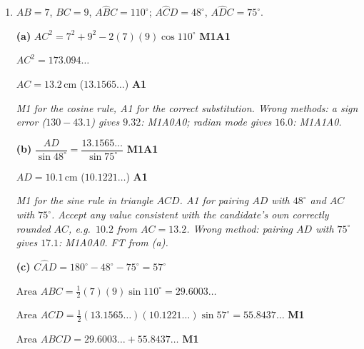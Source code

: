 \documentclass[12pt, twoside]{article}
\begin{document}
\begin{enumerate}[itemsep=0.3cm]
\emph{The last A1 needs the negative sign: $\frac{\sqrt{5}}{3}$ or
$\pm\frac{\sqrt{5}}{3}$ as the final answer earns M1A1A0. A bare
$-\frac{\sqrt{5}}{3}$ with no working earns M0A1A1. Wrong methods:
$\cos\theta = 1 - \frac{2}{3} = \frac{1}{3}$ (squares left out): M0A0A0;
$\cos^{2}\theta = 1 - \frac{2}{3}$, giving $\pm\frac{1}{\sqrt{3}}$: M1A0A0.}

\textbf{(f)} $\tan\theta = \dfrac{\sin\theta}{\cos\theta} =
\dfrac{2/3}{-\sqrt{5}/3} = -\dfrac{2}{\sqrt{5}}$ \hfill \textbf{A1}

\emph{Accept $-\frac{2\sqrt{5}}{5}$. FT from the candidate's $\cos\theta$
in (e), including its sign.}

\newpage

\item[3.] [Maximum mark: 9]

$AB = 7$, $BC = 9$, $A\hat{B}C = 110^\circ$; $A\hat{C}D = 48^\circ$,
$A\hat{D}C = 75^\circ$.

\textbf{(a)} $AC^{2} = 7^{2} + 9^{2} - 2(7)(9)\cos 110^\circ$
\hfill \textbf{M1A1}

$AC^{2} = 173.094\ldots$

$AC = 13.2\,\text{cm}$ \quad ($13.1565\ldots$) \hfill \textbf{A1}

\emph{M1 for the cosine rule, A1 for the correct substitution. Wrong
methods: a sign error ($130 - 43.1$) gives $9.32$: M1A0A0; radian mode
gives $16.0$: M1A1A0.}

\textbf{(b)} $\dfrac{AD}{\sin 48^\circ} = \dfrac{13.1565\ldots}{\sin 75^\circ}$
\hfill \textbf{M1A1}

$AD = 10.1\,\text{cm}$ \quad ($10.1221\ldots$) \hfill \textbf{A1}

\emph{M1 for the sine rule in triangle $ACD$. A1 for pairing $AD$ with
$48^\circ$ and $AC$ with $75^\circ$. Accept any value consistent with the
candidate's own correctly rounded $AC$, e.g.\ $10.2$ from $AC = 13.2$.
Wrong method: pairing $AD$ with $75^\circ$ gives $17.1$: M1A0A0. FT from
(a).}

\textbf{(c)} $C\hat{A}D = 180^\circ - 48^\circ - 75^\circ = 57^\circ$

$\text{Area } ABC = \frac{1}{2}(7)(9)\sin 110^\circ = 29.6003\ldots$

$\text{Area } ACD = \frac{1}{2}(13.1565\ldots)(10.1221\ldots)\sin 57^\circ
= 55.8437\ldots$ \hfill \textbf{M1}

$\text{Area } ABCD = 29.6003\ldots + 55.8437\ldots$ \hfill \textbf{M1}


\end{enumerate}
\end{document}
